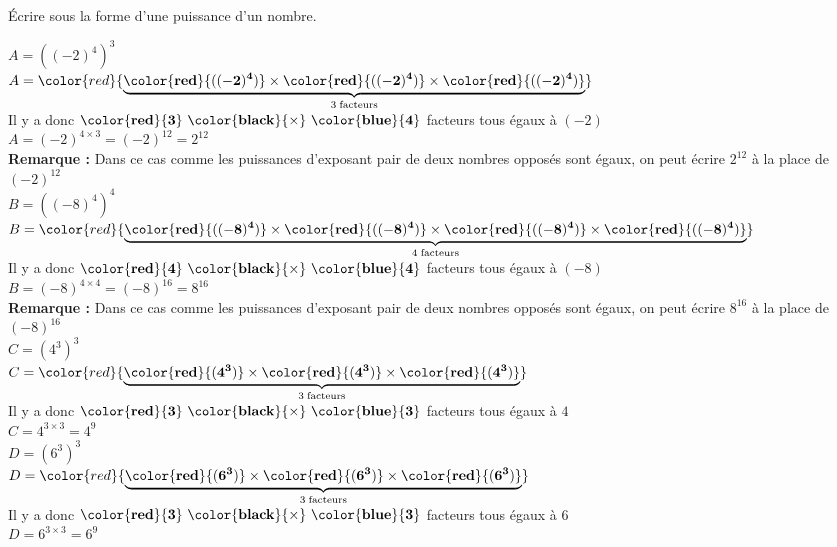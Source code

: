    Écrire sous la forme d'une puissance d'un nombre.
        \begin{spacing}{2}
            $A=\left((-2)^4\right)^{3}$\\
            $A=\color{red}{\underbrace{\mathbf{\color{red}{((-2)^4)}} \times \mathbf{\color{red}{((-2)^4)}}\times \mathbf{\color{red}{((-2)^4)}}}_{3\thickspace\text{facteurs}}}$\\
            Il y a donc $\mathbf{\color{red}{3}~\color{black}{\times}~\color{blue}{4}}$ facteurs tous égaux à $(-2)$\\
            $A=(-2)^{4\times3} = (-2)^{12}=  2^{12}$\\
            \textbf{Remarque : } Dans ce cas comme les puissances d'exposant pair de deux nombres opposés sont égaux, on peut écrire $ 2^{12}$ à la place de $(-2)^{12}$\\

            \medskip
            $B=\left((-8)^4\right)^{4}$\\
            $B=\color{red}{\underbrace{\mathbf{\color{red}{((-8)^4)}} \times \mathbf{\color{red}{((-8)^4)}}\times \mathbf{\color{red}{((-8)^4)}}\times \mathbf{\color{red}{((-8)^4)}}}_{4\thickspace\text{facteurs}}}$\\
            Il y a donc $\mathbf{\color{red}{4}~\color{black}{\times}~\color{blue}{4}}$ facteurs tous égaux à $(-8)$\\
            $B=(-8)^{4\times4} = (-8)^{16}=  8^{16}$\\
            \textbf{Remarque : } Dans ce cas comme les puissances d'exposant pair de deux nombres opposés sont égaux, on peut écrire $ 8^{16}$ à la place de $(-8)^{16}$\\

            \medskip
            $C=\left(4^3\right)^{3}$\\
            $C=\color{red}{\underbrace{\mathbf{\color{red}{(4^3)}} \times \mathbf{\color{red}{(4^3)}}\times \mathbf{\color{red}{(4^3)}}}_{3\thickspace\text{facteurs}}}$\\
            Il y a donc $\mathbf{\color{red}{3}~\color{black}{\times}~\color{blue}{3}}$ facteurs tous égaux à $4$\\
            $C=4^{3\times3} = 4^{9}$\\

            \medskip
            $D=\left(6^3\right)^{3}$\\
            $D=\color{red}{\underbrace{\mathbf{\color{red}{(6^3)}} \times \mathbf{\color{red}{(6^3)}}\times \mathbf{\color{red}{(6^3)}}}_{3\thickspace\text{facteurs}}}$\\
            Il y a donc $\mathbf{\color{red}{3}~\color{black}{\times}~\color{blue}{3}}$ facteurs tous égaux à $6$\\
            $D=6^{3\times3} = 6^{9}$\\
        \end{spacing}
